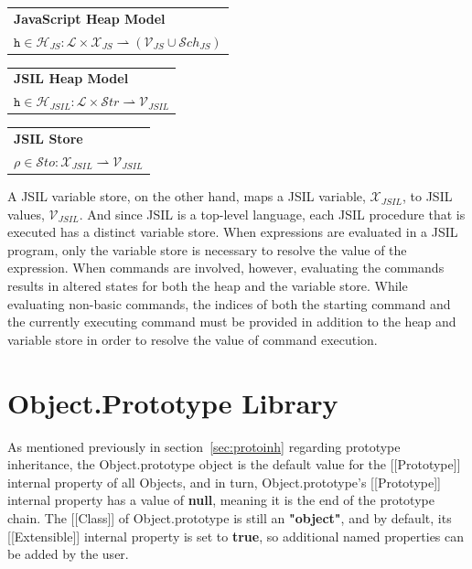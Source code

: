 \documentclass[a4paper,11pt,twoside]{report}
\begin{document}
\begin{center}
\begin{tabular}{p{8cm}} \hline
\textbf{JavaScript Heap Model} \\
$\texttt{h} \in \mathcal{H}_{JS} : \mathcal{L} \times \mathcal{X}_{JS} \rightharpoonup (\mathcal{V}_{JS} \cup \mathcal{S}ch_{JS})$  \\ \hline
\end{tabular}

\vspace{0.3cm}
\begin{tabular}{p{8cm}} \hline
\textbf{JSIL Heap Model} \\
$\texttt{h} \in \mathcal{H}_{JSIL} : \mathcal{L} \times \mathcal{S}tr \rightharpoonup \mathcal{V}_{JSIL}  $  \\ \hline
\end{tabular}

\vspace{0.3cm}
\begin{tabular}{p{8cm}} \hline
\textbf{JSIL Store} \\
$\rho \in \mathcal{S}to : \mathcal{X}_{JSIL} \rightharpoonup \mathcal{V}_{JSIL}  $  \\ \hline
\end{tabular}
\end{center}

A JSIL variable store, on the other hand, maps a JSIL variable, $\mathcal{X}_{JSIL}$, to JSIL values, $\mathcal{V}_{JSIL}$. And since JSIL is a top-level language, each JSIL procedure that is executed has a distinct variable store. When expressions are evaluated in a JSIL program, only the variable store is necessary to resolve the value of the expression. When commands are involved, however, evaluating the commands results in altered states for both the heap and the variable store. While evaluating non-basic commands, the indices of both the starting command and the currently executing command must be provided in addition to the heap and variable store in order to resolve the value of command execution.

\chapter{Object.Prototype Library}
As mentioned previously in section~\ref{sec:protoinh} regarding prototype inheritance, the Object.prototype object is the default value for the [[Prototype]] internal property of all Objects, and in turn, Object.prototype's [[Prototype]] internal property has a value of \textbf{null}, meaning it is the end of the prototype chain. The [[Class]] of Object.prototype is still an \textbf{"object"}, and by default, its [[Extensible]] internal property is set to \textbf{true}, so additional named properties can be added by the user.
\end{document}

